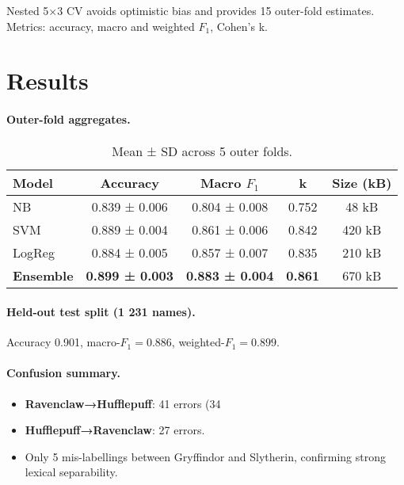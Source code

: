 \documentclass[12pt,a4paper]{article}
\begin{document}
Nested 5×3 CV avoids optimistic bias and provides 15 outer-fold
estimates.  Metrics: accuracy, macro and weighted \(F_{1}\), Cohen’s k.

\section{Results}\label{sec:results}

\paragraph{Outer-fold aggregates.}

\begin{table}[H]
  \centering
  \caption{Mean ± SD across 5 outer folds.}
  \label{tab:cv}
  \begin{tabular}{@{}lcccc@{}}
    \toprule
    Model & Accuracy & Macro \(F_{1}\) & k & Size (kB) \\
    \midrule
    NB         & 0.839 ± 0.006 & 0.804 ± 0.008 & 0.752 & 48 kB \\
    SVM        & 0.889 ± 0.004 & 0.861 ± 0.006 & 0.842 & 420 kB \\
    LogReg     & 0.884 ± 0.005 & 0.857 ± 0.007 & 0.835 & 210 kB \\
    \textbf{Ensemble} & \textbf{0.899 ± 0.003} & \textbf{0.883 ± 0.004}
                      & \textbf{0.861} & 670 kB \\
    \bottomrule
  \end{tabular}
\end{table}

\paragraph{Held-out test split (1 231 names).}

Accuracy 0.901, macro-\(F_{1}=0.886\), weighted-\(F_{1}=0.899\).

\paragraph{Confusion summary.}

\begin{itemize}[leftmargin=1.6em]
  \item \textbf{Ravenclaw→Hufflepuff}: 41 errors (34 %
  \item \textbf{Hufflepuff→Ravenclaw}: 27 errors.
  \item Only 5 mis-labellings between Gryffindor and Slytherin,
        confirming strong lexical separability.
\end{itemize}
\end{document}
